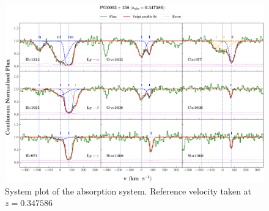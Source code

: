 \begin{landscape}

\thispagestyle{empty}

\begin{figure}
\centering
\vspace{-10mm}
\hspace*{-20mm}
\includegraphics[width=1.1\linewidth]{Figures/PG0003+158_z=0.347586_sys_plot.png}
\caption{System plot of the absorption system. Reference velocity taken at $z=0.347586$}
\label{fig:sys_plot}
\end{figure}

\end{landscape}



                                               
                                               
